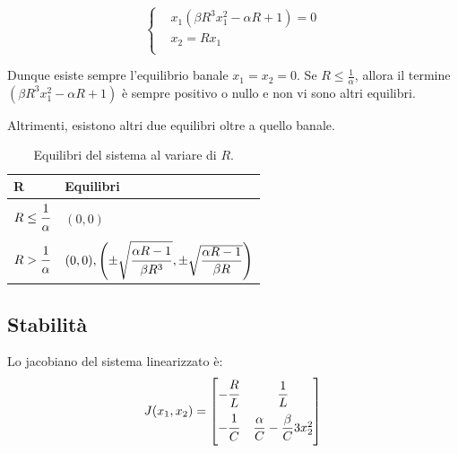\documentclass[11pt, a4paper]{article}
\begin{document}
\begin{equation}
\left\{
\begin{aligned}
    &x_1 ( \beta R^3 x_1^2 - \alpha R + 1) = 0\\
    &x_2 = R x_1\\
\end{aligned}
\right.
\end{equation}

Dunque esiste sempre l'equilibrio banale $x_1 = x_2 = 0$.
Se $R \le \frac{1}{\alpha}$, allora il termine $( \beta R^3 x_1^2 - \alpha R + 1)$ è sempre positivo o nullo e non vi sono altri equilibri.

Altrimenti, esistono altri due equilibri oltre a quello banale.

\begin{table}[h]
\begin{center}
    \begin{tabular}{l | l}
        \textbf{R} & \textbf{Equilibri}\\
        \hline
        $R \le \dfrac{\strut 1}{\strut\alpha}$ & $(0, 0)$\\
        $R > \dfrac{\strut 1}{\strut\alpha}$ & $(0,0),
        \left( \pm \sqrt{\dfrac{\strut\alpha R -1}{\strut\beta R^3}}, \pm \sqrt{\dfrac{\alpha R -1}{\beta R}} \right)$
    \end{tabular}
\end{center}
\caption{Equilibri del sistema al variare di $R$.}
\end{table}

\subsection{Stabilità}
Lo jacobiano del sistema linearizzato è:
\begin{equation}
J(x_1,x_2) =
\begin{bmatrix}
-\dfrac{\strut R}{L\strut} & \dfrac{1}{L} \\
-\dfrac{\strut 1}{C\strut} & \dfrac{\alpha}{C}-\dfrac{\beta}{C} 3x_2^2 \\
\end{bmatrix}
\end{equation}
\end{document}
